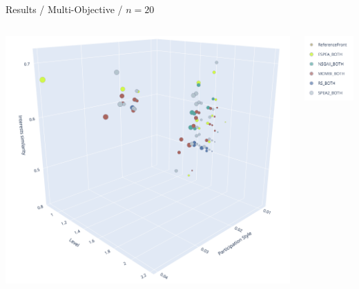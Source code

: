\documentclass{beamer}
\begin{document}
    \begin{frame}{Results / Multi-Objective / $n=20$}
            \begin{columns}
                \begin{column}{0.70\textwidth}
                    \includegraphics[width=\textwidth]{images/20_multi.png}
                \end{column}
                \begin{column}{0.30\textwidth}
                    \includegraphics[width=\textwidth]{images/legend_multi.png}

\end{column}
\end{columns}
\end{frame}
\end{document}
